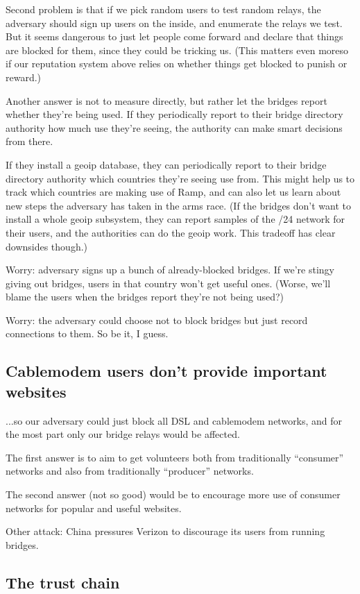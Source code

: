 \documentclass{llncs}
\begin{document}
Second problem is that if we pick random users to test random relays, the
adversary should sign up users on the inside, and enumerate the relays
we test. But it seems dangerous to just let people come forward and
declare that things are blocked for them, since they could be tricking
us. (This matters even moreso if our reputation system above relies on
whether things get blocked to punish or reward.)

Another answer is not to measure directly, but rather let the bridges
report whether they're being used. If they periodically report to their
bridge directory authority how much use they're seeing, the authority
can make smart decisions from there.

If they install a geoip database, they can periodically report to their
bridge directory authority which countries they're seeing use from. This
might help us to track which countries are making use of Ramp, and can
also let us learn about new steps the adversary has taken in the arms
race. (If the bridges don't want to install a whole geoip subsystem, they
can report samples of the /24 network for their users, and the authorities
can do the geoip work. This tradeoff has clear downsides though.)

Worry: adversary signs up a bunch of already-blocked bridges. If we're
stingy giving out bridges, users in that country won't get useful ones.
(Worse, we'll blame the users when the bridges report they're not
being used?)

Worry: the adversary could choose not to block bridges but just record
connections to them. So be it, I guess.

\subsection{Cablemodem users don't provide important websites}

...so our adversary could just block all DSL and cablemodem networks,
and for the most part only our bridge relays would be affected.

The first answer is to aim to get volunteers both from traditionally
``consumer'' networks and also from traditionally ``producer'' networks.

The second answer (not so good) would be to encourage more use of consumer
networks for popular and useful websites.

Other attack: China pressures Verizon to discourage its users from
running bridges.

\subsection{The trust chain}
\label{subsec:trust-chain}
\end{document}
